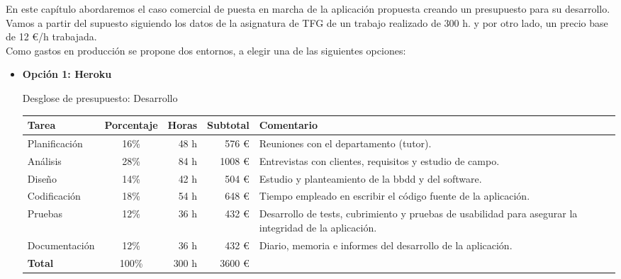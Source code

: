 

En este capítulo abordaremos el caso comercial de puesta en marcha de la aplicación propuesta creando un presupuesto para su desarrollo. Vamos a partir del supuesto siguiendo los datos de la asignatura de TFG de un trabajo realizado de 300 h. y por otro lado, un precio base de 12 \euro/h trabajada. \\

Como gastos en producción se propone dos entornos, a elegir una de las siguientes opciones:

\begin{itemize}

\item \textbf{Opción 1: Heroku}
\begin{center}
    \begin{large}
           Desglose de presupuesto: Desarrollo \\
    \end{large}
    \begin{tabular}{| l | c | r | r | p{5cm} |}
        \hline
        Tarea & Porcentaje & Horas & Subtotal & Comentario \\ \hline
        Planificación & 16\% & 48 h & 576 \euro & Reuniones con el departamento (tutor). \\ \hline
        Análisis & 28\% & 84 h & 1008 \euro & Entrevistas con clientes, requisitos y estudio de campo. \\ \hline
        Diseño & 14\% & 42 h & 504 \euro & Estudio y planteamiento de la bbdd y del software. \\ \hline
        Codificación & 18\% & 54 h & 648 \euro & Tiempo empleado en escribir el código fuente de la aplicación. \\ \hline
        Pruebas & 12\% & 36 h & 432 \euro & Desarrollo de tests, cubrimiento y pruebas de usabilidad para asegurar la integridad de la aplicación. \\ \hline
        Documentación & 12\% & 36 h & 432 \euro & Diario, memoria e informes del desarrollo de la aplicación. \\ \hline
        \textbf{Total} & 100\% & 300 h & 3600 \euro & \\ \hline
        \hline
    \end{tabular}
\end{center}


\end{itemize}
